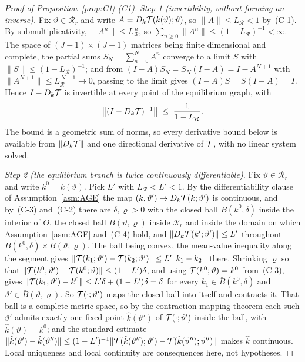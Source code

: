 \begin{proof}[Proof of Proposition~\ref{prop:C1} (C1)]
\emph{Step 1 (invertibility, without forming an inverse).} Fix $\vartheta\in\mathcal R_r$ and write
$A = D_k\mathcal{T}(k(\vartheta);\vartheta)$, so $\lVert A\rVert \le L_{\mathcal R} < 1$ by~(C-1). By
submultiplicativity, $\lVert A^n\rVert \le L_{\mathcal R}^{\,n}$, so
$\sum_{n\ge0}\lVert A^n\rVert \le (1-L_{\mathcal R})^{-1} < \infty$. The space of
$(J-1)\times(J-1)$ matrices being finite dimensional and complete, the partial sums
$S_N = \sum_{n=0}^{N}A^n$ converge to a limit $S$ with
$\lVert S\rVert \le (1-L_{\mathcal R})^{-1}$; and from $(I-A)S_N = S_N(I-A) = I - A^{N+1}$ with
$\lVert A^{N+1}\rVert \le L_{\mathcal R}^{\,N+1} \to 0$, passing to the limit gives
$(I-A)S = S(I-A) = I$. Hence $I - D_k\mathcal{T}$ is invertible at every point of the equilibrium graph,
with
\begin{equation}
\label{eq:C1-neumann}
\bigl\lVert (I-D_k\mathcal{T})^{-1} \bigr\rVert \;\le\; \frac{1}{1-L_{\mathcal R}} .
\end{equation}
The bound is a geometric sum of norms, so every derivative bound below is available from
$\lVert D_k\mathcal{T}\rVert$ and one directional derivative of $\mathcal{T}$, with no linear system solved.

\emph{Step 2 (the equilibrium branch is twice continuously differentiable).} Fix
$\vartheta\in\mathcal R_r$ and write $k^0 = k(\vartheta)$. Pick $L'$ with
$L_{\mathcal R} < L' < 1$. By the differentiability clause of Assumption~\ref{asm:AGE} the map
$(k,\vartheta')\mapsto D_k\mathcal{T}(k;\vartheta')$ is continuous, and by~(C-3) and~(C-2) there are
$\delta,\varrho > 0$ with the closed ball $\bar B(k^0,\delta)$ inside the interior of $\Theta$, the
closed ball $\bar B(\vartheta,\varrho)$ inside $\mathcal R_r$ and inside the domain on which
Assumption~\ref{asm:AGE} and~(C-4) hold, and $\lVert D_k\mathcal{T}(k';\vartheta')\rVert \le L'$
throughout $\bar B(k^0,\delta)\times\bar B(\vartheta,\varrho)$. The ball being convex, the
mean-value inequality along the segment gives
$\lVert \mathcal{T}(k_1;\vartheta') - \mathcal{T}(k_2;\vartheta')\rVert \le L'\lVert k_1-k_2\rVert$ there.
Shrinking $\varrho$ so that
$\lVert \mathcal{T}(k^0;\vartheta') - \mathcal{T}(k^0;\vartheta)\rVert \le (1-L')\delta$, and using
$\mathcal{T}(k^0;\vartheta) = k^0$ from~(C-3), gives
$\lVert \mathcal{T}(k_1;\vartheta') - k^0\rVert \le L'\delta + (1-L')\delta = \delta$ for every
$k_1\in\bar B(k^0,\delta)$ and $\vartheta'\in\bar B(\vartheta,\varrho)$. So
$\mathcal{T}(\cdot;\vartheta')$ maps the closed ball into itself and contracts it. That ball is a complete
metric space, so by the contraction mapping theorem each such $\vartheta'$ admits exactly one fixed
point $\hat k(\vartheta')$ of $\mathcal{T}(\cdot;\vartheta')$ inside the ball, with
$\hat k(\vartheta) = k^0$; and the standard estimate
$\lVert\hat k(\vartheta')-\hat k(\vartheta'')\rVert \le (1-L')^{-1}\lVert
\mathcal{T}(\hat k(\vartheta'');\vartheta') - \mathcal{T}(\hat k(\vartheta'');\vartheta'')\rVert$ makes
$\hat k$ continuous. Local uniqueness and local continuity are consequences here, not hypotheses.


\end{proof}

